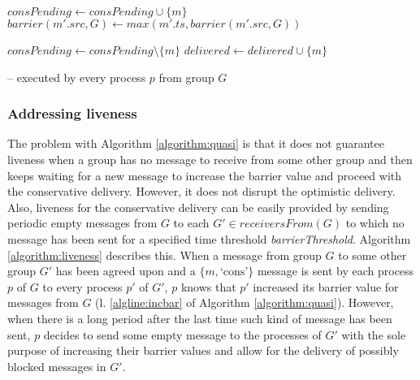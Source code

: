 \documentclass[times, 10pt]{article}
\begin{document}
\begin{algorithm}
\begin{distribalgo}[1]
\blankline
{}
    \STATE $consPending \leftarrow consPending \cup \{m\}$
  \ENDIF
  \STATE $barrier(m'.src,G) \leftarrow max(m'.ts, barrier(m'.src,G))$ \label{algline:incbar} 
\ENDINDENT

\blankline
{}
  \STATE $consPending \leftarrow consPending \setminus \{m\}$
  \STATE {}
  \STATE $delivered \leftarrow delivered \cup \{m\}$

\blankline
\ENDINDENT

\caption{ -- executed by every process $p$ from group $G$}
\label{algorithm:quasi}
\end{distribalgo}
\end{algorithm}

\subsubsection{Addressing liveness}

The problem with Algorithm \ref{algorithm:quasi} is that it does not guarantee liveness when a group has no message to receive from some other group and then keeps waiting for a new message to increase the barrier value and proceed with the conservative delivery. However, it does not disrupt the optimistic delivery. Also, liveness for the conservative delivery can be easily provided by sending periodic empty messages from $G$ to each $G' \in receiversFrom(G)$ to which no message has been sent for a specified time threshold \textit{barrierThreshold}. Algorithm \ref{algorithm:liveness} describes this. When a message from group $G$ to some other group $G'$ has been agreed upon and a $\{m, \text{`cons'}\}$ message is sent by each process $p$ of $G$ to every process $p'$ of $G'$, $p$ knows that $p'$ increased its barrier value for messages from $G$ (l. \ref{algline:incbar} of Algorithm \ref{algorithm:quasi}). However, when there is a long period after the last time such kind of message has been sent, $p$ decides to send some empty message to the processes of $G'$ with the sole purpose of increasing their barrier values and allow for the delivery of possibly blocked messages in $G'$.
\end{document}
